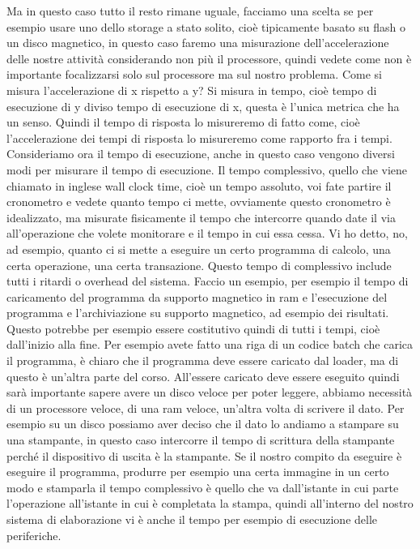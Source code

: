 Ma in questo caso tutto il resto rimane uguale, facciamo una scelta se per esempio usare uno dello storage a stato solito, cioè tipicamente basato su flash o un disco magnetico, in questo caso faremo una misurazione dell'accelerazione delle nostre attività considerando non più il processore, quindi vedete come non è importante focalizzarsi solo sul processore ma sul nostro problema.
Come si misura l'accelerazione di x rispetto a y?
Si misura in tempo, cioè tempo di esecuzione di y diviso tempo di esecuzione di x, questa è l'unica metrica che ha un senso.
Quindi il tempo di risposta lo misureremo di fatto come, cioè l'accelerazione dei tempi di risposta lo misureremo come rapporto fra i tempi.
Consideriamo ora il tempo di esecuzione, anche in questo caso vengono diversi modi per misurare il tempo di esecuzione.
Il tempo complessivo, quello che viene chiamato in inglese wall clock time, cioè un tempo assoluto, voi fate partire il cronometro e vedete quanto tempo ci mette, ovviamente questo cronometro è idealizzato, ma misurate fisicamente il tempo che intercorre quando date il via all'operazione che volete monitorare e il tempo in cui essa cessa.
Vi ho detto, no, ad esempio, quanto ci si mette a eseguire un certo programma di calcolo, una certa operazione, una certa transazione.
Questo tempo di complessivo include tutti i ritardi o overhead del sistema.
Faccio un esempio, per esempio il tempo di caricamento del programma da supporto magnetico in ram e l'esecuzione del programma e l'archiviazione su supporto magnetico, ad esempio dei risultati.
Questo potrebbe per esempio essere costitutivo quindi di tutti i tempi, cioè dall'inizio alla fine.
Per esempio avete fatto una riga di un codice batch che carica il programma, è chiaro che il programma deve essere caricato dal loader, ma di questo è un'altra parte del corso.
All'essere caricato deve essere eseguito quindi sarà importante sapere avere un disco veloce per poter leggere, abbiamo necessità di un processore veloce, di una ram veloce, un'altra volta di scrivere il dato.
Per esempio su un disco possiamo aver deciso che il dato lo andiamo a stampare su una stampante, in questo caso intercorre il tempo di scrittura della stampante perché il dispositivo di uscita è la stampante.
Se il nostro compito da eseguire è eseguire il programma, produrre per esempio una certa immagine in un certo modo e stamparla il tempo complessivo è quello che va dall'istante in cui parte l'operazione all'istante in cui è completata la stampa, quindi all'interno del nostro sistema di elaborazione vi è anche il tempo per esempio di esecuzione delle periferiche.
